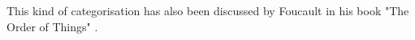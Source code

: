 This kind of categorisation has also been discussed by Foucault in his book "The Order of Things" \citep{Foucault1966}.

%

